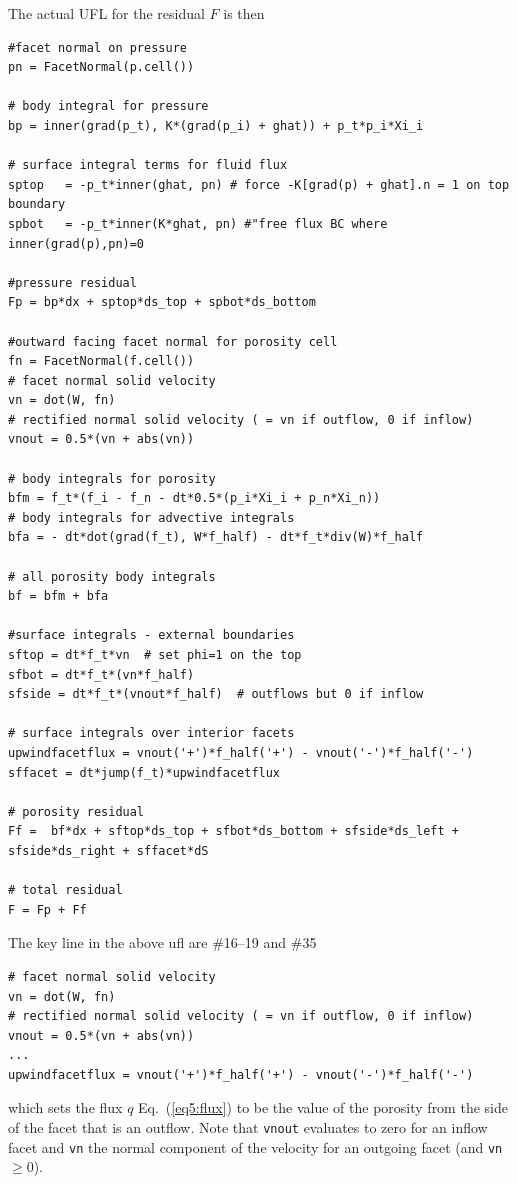 The actual UFL for the residual $F$ is then
\begin{lstlisting}[style=UFL]
#facet normal on pressure
pn = FacetNormal(p.cell())

# body integral for pressure
bp = inner(grad(p_t), K*(grad(p_i) + ghat)) + p_t*p_i*Xi_i 

# surface integral terms for fluid flux 
sptop   = -p_t*inner(ghat, pn) # force -K[grad(p) + ghat].n = 1 on top boundary
spbot   = -p_t*inner(K*ghat, pn) #"free flux BC where inner(grad(p),pn)=0

#pressure residual
Fp = bp*dx + sptop*ds_top + spbot*ds_bottom

#outward facing facet normal for porosity cell
fn = FacetNormal(f.cell())
# facet normal solid velocity
vn = dot(W, fn)
# rectified normal solid velocity ( = vn if outflow, 0 if inflow)
vnout = 0.5*(vn + abs(vn))

# body integrals for porosity
bfm = f_t*(f_i - f_n - dt*0.5*(p_i*Xi_i + p_n*Xi_n))
# body integrals for advective integrals
bfa = - dt*dot(grad(f_t), W*f_half) - dt*f_t*div(W)*f_half

# all porosity body integrals
bf = bfm + bfa

#surface integrals - external boundaries
sftop = dt*f_t*vn  # set phi=1 on the top
sfbot = dt*f_t*(vn*f_half)
sfside = dt*f_t*(vnout*f_half)  # outflows but 0 if inflow

# surface integrals over interior facets
upwindfacetflux = vnout('+')*f_half('+') - vnout('-')*f_half('-')
sffacet = dt*jump(f_t)*upwindfacetflux

# porosity residual
Ff =  bf*dx + sftop*ds_top + sfbot*ds_bottom + sfside*ds_left + sfside*ds_right + sffacet*dS

# total residual
F = Fp + Ff
\end{lstlisting}

\pagebreak{}
The key line in the above ufl are \#16--19 and  \#35
\begin{lstlisting}[style=UFL]
# facet normal solid velocity
vn = dot(W, fn)
# rectified normal solid velocity ( = vn if outflow, 0 if inflow)
vnout = 0.5*(vn + abs(vn))
...
upwindfacetflux = vnout('+')*f_half('+') - vnout('-')*f_half('-')
\end{lstlisting}
which sets the flux $q$ Eq.\ (\ref{eq5:flux}) to be the value of the
porosity from the side of the facet that is an outflow.  Note that
\texttt{vnout} evaluates to zero for an inflow facet and \texttt{vn}
the normal component of the velocity for an outgoing facet (and
\texttt{vn}$\geq 0$).

